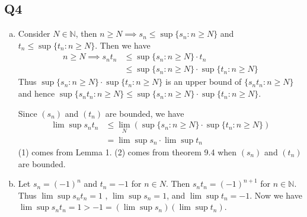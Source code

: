 \documentclass[12pt,lettersize]{article}
\newcommand{\N}{\mathbb{N}}
\theoremstyle{remark}
\begin{document}
	\setcounter{equation}{0}
	\subsection*{Q4}
	\begin{enumerate}[(a)]
		\item Consider $N\in\N$, then $n\geq N \implies s_n \leq \sup\{s_n: n\geq N\}$ and $t_n\leq\sup\{t_n: n\geq N\}$. Then we have
		\begin{align*}
			n\geq N \implies s_nt_n &\leq \sup\{s_n: n\geq N\}\cdot t_n\\
								    &\leq \sup\{s_n: n\geq N\}\cdot\sup\{t_n: n\geq N\}
		\end{align*}
		Thus $\sup\{s_n: n\geq N\}\cdot\sup\{t_n: n\geq N\}$ is an upper bound of $\{s_nt_n: n\geq N\}$ and hence $\sup\{s_nt_n: n\geq N\}\leq\sup\{s_n: n\geq N\}\cdot\sup\{t_n: n\geq N\}$.
		
		Since $(s_n)$ and $(t_n)$ are bounded, we have
		\begin{align}
			\lim\sup s_nt_n &\leq \lim_N(\sup\{s_n: n\geq N\}\cdot\sup\{t_n: n\geq N\})\\
							&= \lim\sup s_n\cdot\lim\sup t_n
		\end{align}
		(1) comes from Lemma 1. (2) comes from theorem 9.4 when $(s_n)$ and $(t_n)$ are bounded.
		\item Let $s_n = (-1)^n$ and $t_n=-1$ for $n\in N$. Then $s_nt_n=(-1)^{n+1}$ for $n\in\N$. Thus $\lim\sup s_nt_n=1$ , $\lim\sup s_n=1$, and $\lim\sup t_n=-1$. Now we have $\lim\sup s_nt_n=1>-1=(\lim\sup s_n)(\lim\sup t_n)$.
	\end{enumerate}
	\newpage
	
\end{document}
